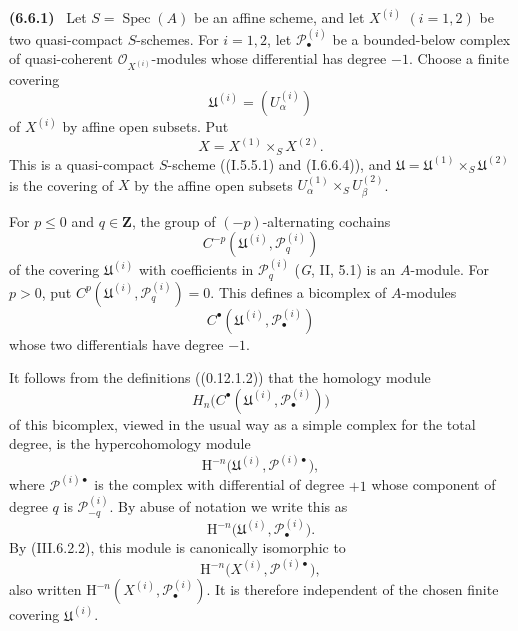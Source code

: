 \documentclass[10pt,oneside]{book}
\newcommand{\sh}[1]{\mathscr{#1}}
\newcommand{\HH}{\mathrm H}
\newcommand{\bb}[1]{\mathbf{#1}}
\newcommand{\Spec}{\operatorname{Spec}}
\newcommand{\sref}[2][]{(#2)}
\newenvironment{env}[1][]{\par\medskip\noindent\textbf{(#1)}\ }{\par}
\begin{document}
\begin{env}[6.6.1]
\label{III.6.6.1}
Let $S=\Spec(A)$ be an affine scheme, and let $X^{(i)}$
$(i=1,2)$ be two quasi-compact $S$-schemes.  For $i=1,2$, let
$\sh P_\bullet^{(i)}$ be a bounded-below complex of
quasi-coherent $\sh O_{X^{(i)}}$-modules whose differential has
degree $-1$.  Choose a finite covering
\[
  \mathfrak U^{(i)}=(U_\alpha^{(i)})
\]
of $X^{(i)}$ by affine open subsets.  Put
\[
  X=X^{(1)}\times_SX^{(2)}.
\]
This is a quasi-compact $S$-scheme
(\sref[I]{I.5.5.1} and \sref[I]{I.6.6.4}), and
$\mathfrak U=\mathfrak U^{(1)}\times_S\mathfrak U^{(2)}$ is the
covering of $X$ by the affine open subsets
$U_\alpha^{(1)}\times_SU_\beta^{(2)}$.

For $p\leq0$ and $q\in\bb Z$, the group of $(-p)$-alternating
cochains
\[
  C^{-p}(\mathfrak U^{(i)},\sh P_q^{(i)})
\]
of the covering $\mathfrak U^{(i)}$ with coefficients in
$\sh P_q^{(i)}$ (\emph{G}, II, 5.1) is an $A$-module.  For
$p>0$, put
$C^p(\mathfrak U^{(i)},\sh P_q^{(i)})=0$.  This defines a
bicomplex of $A$-modules
\[
  C^\bullet(\mathfrak U^{(i)},\sh P_\bullet^{(i)})
\]
whose two differentials have degree $-1$.

It follows from the definitions (\sref[0]{0.12.1.2}) that the
homology module
\[
  H_n\bigl(C^\bullet
    (\mathfrak U^{(i)},\sh P_\bullet^{(i)})\bigr)
\]
of this bicomplex, viewed in the usual way as a simple complex
for the total degree, is the hypercohomology module
\[
  \HH^{-n}
  \bigl(\mathfrak U^{(i)},\sh P^{(i)\bullet}\bigr),
\]
where $\sh P^{(i)\bullet}$ is the complex with differential of
degree $+1$ whose component of degree $q$ is
$\sh P_{-q}^{(i)}$.  By abuse of notation we write this as
\[
  \HH^{-n}
  \bigl(\mathfrak U^{(i)},\sh P_\bullet^{(i)}\bigr).
\]
By \sref{III.6.2.2}, this module is canonically isomorphic to
\[
  \HH^{-n}\bigl(X^{(i)},\sh P^{(i)\bullet}\bigr),
\]
also written
$\HH^{-n}(X^{(i)},\sh P_\bullet^{(i)})$.  It is therefore
independent of the chosen finite covering
$\mathfrak U^{(i)}$.
\end{env}
\end{document}

